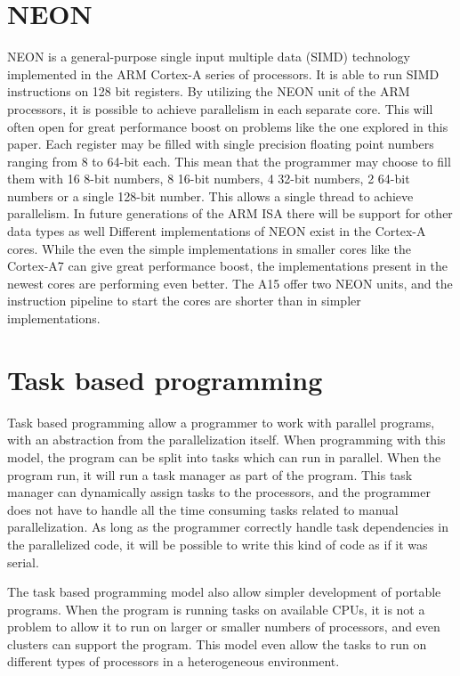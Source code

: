 \section{NEON}
NEON is a general-purpose single input multiple data (SIMD) technology implemented in the ARM Cortex-A series of processors.
It is able to run SIMD instructions on 128 bit registers.
By utilizing the NEON unit of the ARM processors, it is possible to achieve parallelism in each separate core.
This will often open for great performance boost on problems like the one explored in this paper.
Each register may be filled with single precision floating point numbers ranging from 8 to 64-bit each.
This mean that the programmer may choose to fill them with 16 8-bit numbers, 8 16-bit numbers, 4 32-bit numbers, 2 64-bit numbers or a single 128-bit number.
This allows a single thread to achieve parallelism.
In future generations of the ARM ISA there will be support for other data types as well %
Different implementations of NEON exist in the Cortex-A cores.
While the even the simple implementations in smaller cores like the Cortex-A7 can give great performance boost, the implementations present in the newest cores are performing even better.
The A15 offer two NEON units, and the instruction pipeline to start the cores are shorter than in simpler implementations.

\section{Task based programming}
Task based programming allow a programmer to work with parallel programs, with an abstraction from the parallelization itself.
When programming with this model, the program can be split into tasks which can run in parallel.
When the program run, it will run a task manager as part of the program.
This task manager can dynamically assign tasks to the processors, and the programmer does not have to handle all the time consuming tasks related to manual parallelization.
As long as the programmer correctly handle task dependencies in the parallelized code, it will be possible to write this kind of code as if it was serial.

The task based programming model also allow simpler development of portable programs.
When the program is running tasks on available CPUs, it is not a problem to allow it to run on larger or smaller numbers of processors, and even clusters can support the program.
This model even allow the tasks to run on different types of processors in a heterogeneous environment.

